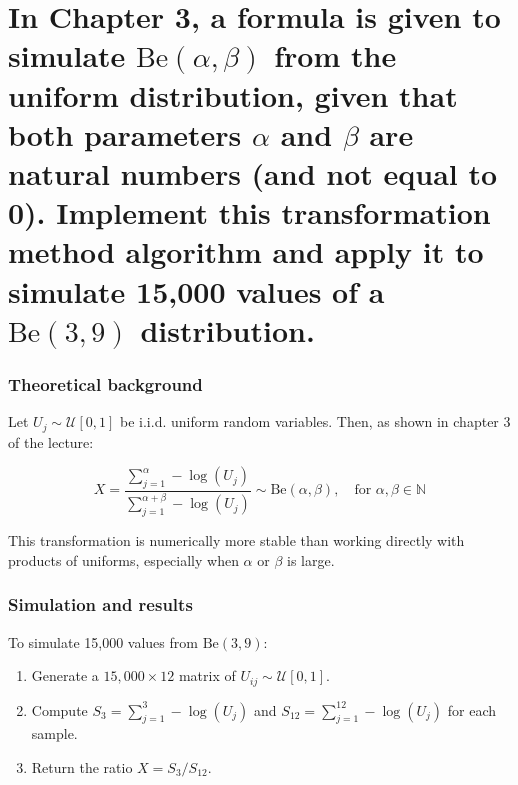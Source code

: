 \newpage

\section{In Chapter 3, a formula is given to simulate $\text{Be}(\alpha, \beta)$ from the uniform distribution, given that both parameters $\alpha$ and $\beta$ are natural numbers (and not equal to 0). Implement this transformation method algorithm and apply it to simulate 15,000 values of a $\text{Be}(3, 9)$ distribution.} \label{sec:4}


\subsubsection*{Theoretical background}

Let $U_j \sim \mathcal{U}[0, 1]$ be i.i.d. uniform random variables. Then, as shown in chapter 3 of the lecture:

\begin{equation}
X = \frac{ \sum_{j=1}^{\alpha} -\log(U_j) }{ \sum_{j=1}^{\alpha + \beta} -\log(U_j) } \sim \text{Be}(\alpha, \beta), \quad \text{for } \alpha, \beta \in \mathbb{N}
\end{equation}

This transformation is numerically more stable than working directly with products of uniforms, especially when $\alpha$ or $\beta$ is large.

\subsubsection*{Simulation and results}

To simulate 15,000 values from $\text{Be}(3, 9)$:
\begin{enumerate}
    \item Generate a $15{,}000 \times 12$ matrix of $U_{ij} \sim \mathcal{U}[0,1]$.
    \item Compute $S_3 = \sum_{j=1}^{3} -\log(U_j)$ and $S_{12} = \sum_{j=1}^{12} -\log(U_j)$ for each sample.
    \item Return the ratio $X = S_3 / S_{12}$.
\end{enumerate}

